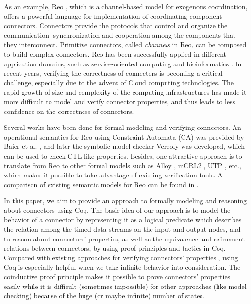 \documentclass{llncs}
\begin{document}
As an example, Reo \cite{Arb04}, which is a channel-based model for exogenous coordination, offers
a powerful language for implementation of coordinating component connectors. Connectors provide the protocols that control and organize
the communication, synchronization and cooperation among the components that they interconnect. Primitive connectors, called {\em channels}
in Reo, can be composed to build complex connectors. Reo has been successfully applied in different application domains, such as
service-oriented computing and bioinformatics \cite{CCA04,SA07}. In recent years,
verifying the correctness of connectors is becoming a critical challenge, especially due to the advent of Cloud computing
technologies. The rapid growth of size and complexity of the computing infrastructures has made it more difficult to model
and verify connector properties, and thus leads to less confidence on the correctness of connectors.


Several works have been done for formal modeling and verifying
connectors. An operational semantics for Reo using Constraint Automata
(CA) was provided by Baier et al. \cite{BSAR06}, and later the symbolic model checker Vereofy \cite{BBK+10} was developed,
which can be used to check CTL-like properties.
Besides, one attractive approach is to translate from Reo to other formal models such as Alloy
\cite{KSA+08}, mCRL2 \cite{KKV12}, UTP \cite{AAA+09,SAA+12}, etc.,
which makes it possible to take advantage of existing verification
tools. A comparison of existing semantic models for Reo can be found
in \cite{JA12}.

In this paper, we aim to provide an approach to formally modeling and reasoning about connectors using Coq.
The basic idea of our
approach is to model the behavior of a connector by representing it as a logical predicate which describes the relation among
the timed data streams on the input and output nodes, and to reason about connectors' properties, as
well as the equivalence and refinement relations
between connectors, by using proof principles and tactics in Coq.
Compared with existing approaches for verifying connectors' properties \cite{BBK+10,KB09,KKV12}, using Coq is especially helpful when
we take infinite behavior into consideration. The coinductive proof principle makes it possible to prove connectors' properties easily while it
is difficult (sometimes impossible) for other approaches (like model checking) because of the huge (or maybe infinite) number of states.
\end{document}
